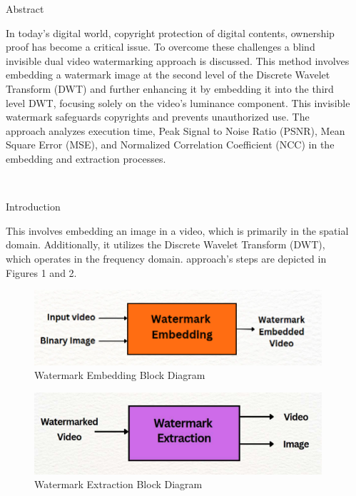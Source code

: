 \documentclass[final]{beamer}
\newlength{\sepwidth}
\newlength{\colwidth}
\newcommand{\separatorcolumn}{\begin{column}{\sepwidth}\end{column}}
\begin{document}
\begin{frame}[t]
\begin{columns}[t]
\separatorcolumn

\begin{column}{\colwidth}

  \begin{block}{Abstract}
     
In today's digital world, copyright protection of digital contents, ownership proof has become a critical issue. To overcome these challenges a blind invisible dual video watermarking approach is discussed. This method involves embedding a watermark image at the second level of the Discrete Wavelet Transform (DWT) and further enhancing it by embedding it into the third level DWT, focusing solely on the video's luminance component. This invisible watermark safeguards copyrights and prevents unauthorized use. The approach analyzes execution time, Peak Signal to Noise Ratio (PSNR), Mean Square Error (MSE), and Normalized Correlation Coefficient (NCC) in the embedding and extraction processes.
 \end{block}
\\
  \begin{block}{Introduction}

    This involves embedding an image in a video, which is primarily in the spatial domain. Additionally, it utilizes 
 the Discrete Wavelet Transform (DWT), which operates in the frequency domain.
\parThe approach's steps are depicted in Figures 1 and 2.

\lipsum
\begin{figure}
    \centering
    \includegraphics[width=1.0\textwidth]{images and logos/embeddingBD.png}
    \caption{Watermark Embedding Block Diagram}
    \label{fig:img1}
\end{figure}
\lipsum

\lipsum
\begin{figure}
    \centering
    \includegraphics[width=1.0\textwidth]{images and logos/extraction_blockdiagram.pdf}
    \caption{Watermark Extraction Block Diagram}
    \label{fig:img1}
\end{figure}
\lipsum


\end{block}
\end{column}
\end{columns}
\end{frame}
\end{document}
